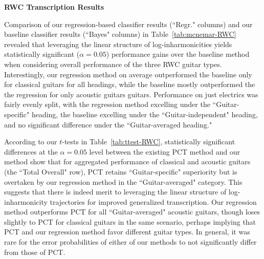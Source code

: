 \documentclass[12pt]{cmuthesis}
\begin{document}
\textbf{RWC Transcription Results}

Comparison of our regression-based classifier results (``Regr." columns) and our baseline classifier results (``Bayes" columns) in Table~\ref{tab:mcnemar-RWC} revealed that leveraging the linear structure of log-inharmonicities yields statistically significant ($\alpha = 0.05$) performance gains over the baseline method when considering overall performance of the three RWC guitar types. Interestingly, our regression method on average outperformed the baseline only for classical guitars for all headings, while the baseline mostly outperformed the the regression for only acoustic guitars guitars. Performance on just electrics was fairly evenly split, with the regression method excelling under the ``Guitar-specific" heading, the baseline excelling under the ``Guitar-independent" heading, and no significant difference under the ``Guitar-averaged heading."

According to our $t$-tests in Table~\ref{tab:ttest-RWC}, statistically significant differences at the $\alpha = 0.05$ level between the existing PCT method and our method show that for aggregated performance of classical and acoustic guitars (the ``Total Overall" row), PCT retains ``Guitar-specific" superiority but is overtaken by our regression method in the ``Guitar-averaged" category. This suggests that there is indeed merit to leveraging the linear structure of log-inharmonicity trajectories for improved generalized transcription. Our regression method outperforms PCT for all ``Guitar-averaged" acoustic guitars, though loses slightly to PCT for classical guitars in the same scenario, perhaps implying that PCT and our regression method favor different guitar types. In general, it was rare for the error probabilities of either of our methods to not significantly differ from those of PCT.
\end{document}
